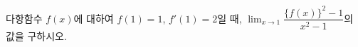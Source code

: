 다항함수 $f(x)$에 대하여 $f(1)=1$, $f'(1)=2$일 때, $\displaystyle\lim_{x\to 1}\dfrac{\{f(x)\}^2-1}{x^2-1}$의 값을 구하시오.
